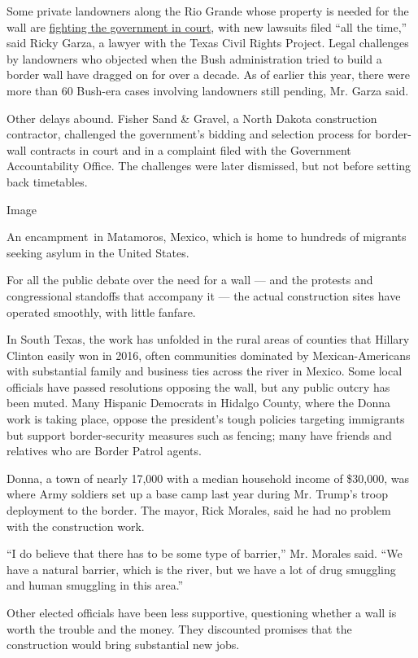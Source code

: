 Some private landowners along the Rio Grande whose property is needed
for the wall are
\href{https://www.nytimes3xbfgragh.onion/2017/05/07/us/politics/trump-wall-faces-barrier-in-texas.html}{fighting
the government in court}, with new lawsuits filed ``all the time,'' said
Ricky Garza, a lawyer with the Texas Civil Rights Project. Legal
challenges by landowners who objected when the Bush administration tried
to build a border wall have dragged on for over a decade. As of earlier
this year, there were more than 60 Bush-era cases involving landowners
still pending, Mr. Garza said.

Other delays abound. Fisher Sand \& Gravel, a North Dakota construction
contractor, challenged the government's bidding and selection process
for border-wall contracts in court and in a complaint filed with the
Government Accountability Office. The challenges were later dismissed,
but not before setting back timetables.

Image

An encampment~in Matamoros, Mexico, which is home to hundreds of
migrants seeking asylum in the United States.

For all the public debate over the need for a wall --- and the protests
and congressional standoffs that accompany it --- the actual
construction sites have operated smoothly, with little fanfare.

In South Texas, the work has unfolded in the rural areas of counties
that Hillary Clinton easily won in 2016, often communities dominated by
Mexican-Americans with substantial family and business ties across the
river in Mexico. Some local officials have passed resolutions opposing
the wall, but any public outcry has been muted. Many Hispanic Democrats
in Hidalgo County, where the Donna work is taking place, oppose the
president's tough policies targeting immigrants but support
border-security measures such as fencing; many have friends and
relatives who are Border Patrol agents.

Donna, a town of nearly 17,000 with a median household income of
\$30,000, was where Army soldiers set up a base camp last year during
Mr. Trump's troop deployment to the border. The mayor, Rick Morales,
said he had no problem with the construction work.

``I do believe that there has to be some type of barrier,'' Mr. Morales
said. ``We have a natural barrier, which is the river, but we have a lot
of drug smuggling and human smuggling in this area.''

Other elected officials have been less supportive, questioning whether a
wall is worth the trouble and the money. They discounted promises that
the construction would bring substantial new jobs.

